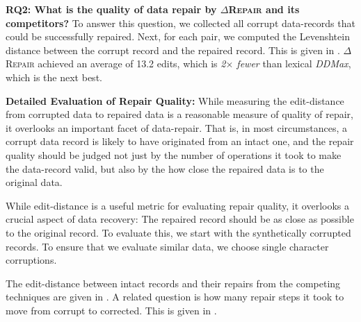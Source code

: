 \documentclass[acmsmall,screen,review,anonymous]{acmart}
\newcommand{\dtask}{data repair\xspace}
\newcommand{\approach}{\textsc{$\Delta$Repair}\xspace}
\newcommand{\ddmax}{\textit{DDMax}\xspace}
\newcommand{\drepair}{\approach}
\begin{document}
\noindent\textbf{RQ2: What is the quality of \dtask by \drepair and its competitors?}
To answer this question, we collected all corrupt data-records that could be
successfully repaired. Next, for each pair, we computed the Levenshtein distance
between the corrupt record and the repaired record. This is given in
.
\drepair achieved an average of 13.2 edits,
which is \emph{2$\times$ fewer} than
lexical \ddmax, which is the next best. %


\noindent\textbf{Detailed Evaluation of Repair Quality:}
While measuring the edit-distance from corrupted data to repaired data is a
reasonable measure of quality of repair, it overlooks an important facet
of data-repair. That is, in most circumstances, a corrupt data record is likely
to have originated from an intact one, and the repair quality should be judged
not just by the number of operations it took to make the data-record valid, but
also by the how close the repaired data is to the original data.

While edit-distance is a useful metric for evaluating repair quality,
it overlooks a crucial aspect of data recovery: The repaired record
should be as close as possible to the original record.
To evaluate this, we start with the synthetically corrupted records.
To ensure that we evaluate similar data, we choose single character
corruptions.

The edit-distance between intact records and their repairs from the competing
techniques are given in . A related question 
is how many repair steps it took to move from corrupt to corrected. This
is given in .

% 
% 
% 
% 
\end{document}
